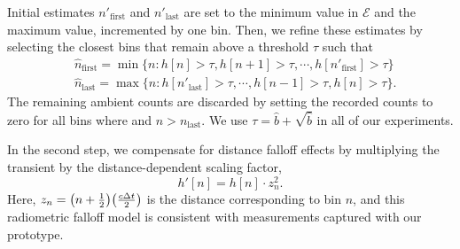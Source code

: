 Initial estimates $n'_\text{first}$ and $n'_\text{last}$ are set to the minimum
value in $\mathcal{E}$ and the maximum value, incremented by one bin. 
Then, we refine these estimates by selecting the closest bins that remain above
a threshold $\tau$ such that
\begin{equation}
    \begin{split}
        &\hat n_\text{first}=\min\{n : h[n] > \tau, h[n+1] > \tau,
            \cdots, h[n'_\text{first}] > \tau\}\\
        &\hat n_\text{last}=\max\{n : h[n'_\text{last}] > \tau,
    \cdots, h[n-1] > \tau, h[n] > \tau\}.
    \end{split}
\end{equation}
The remaining ambient counts are discarded by setting the recorded counts to
zero for all bins where  and $n > n_\text{last}$. We use 
$\tau = \hat b + \sqrt{\hat b}$ in all of our experiments.


\vspace{0.8em}
In the second step, we compensate for distance falloff effects by multiplying
the transient
by the distance-dependent scaling factor,
%
\begin{equation}
    h'[n] = h[n] \cdot z_n^2.
  \label{eq:h_scaled}
\end{equation}
%
Here, $z_n= \paren*{n + \frac12}\paren*{\frac{c\Delta t}{2}}$ is the distance
corresponding to bin $n$, and this radiometric falloff model is consistent with
measurements captured with our prototype.

